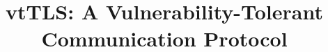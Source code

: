 \documentclass{sig-alternate-05-2015}
\begin{document}





%

\title{vtTLS: A Vulnerability-Tolerant Communication Protocol}

%
%
%
%
%
\end{document}

